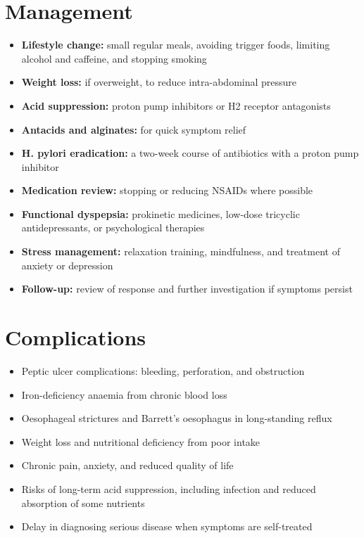 \section*{Management}
\begin{itemize}
    \item \textbf{Lifestyle change:} small regular meals, avoiding trigger foods, limiting alcohol and caffeine, and stopping smoking
    \item \textbf{Weight loss:} if overweight, to reduce intra-abdominal pressure
    \item \textbf{Acid suppression:} proton pump inhibitors or H2 receptor antagonists
    \item \textbf{Antacids and alginates:} for quick symptom relief
    \item \textbf{H. pylori eradication:} a two-week course of antibiotics with a proton pump inhibitor
    \item \textbf{Medication review:} stopping or reducing NSAIDs where possible
    \item \textbf{Functional dyspepsia:} prokinetic medicines, low-dose tricyclic antidepressants, or psychological therapies
    \item \textbf{Stress management:} relaxation training, mindfulness, and treatment of anxiety or depression
    \item \textbf{Follow-up:} review of response and further investigation if symptoms persist
\end{itemize}

\section*{Complications}
\begin{itemize}
    \item Peptic ulcer complications: bleeding, perforation, and obstruction
    \item Iron-deficiency anaemia from chronic blood loss
    \item Oesophageal strictures and Barrett's oesophagus in long-standing reflux
    \item Weight loss and nutritional deficiency from poor intake
    \item Chronic pain, anxiety, and reduced quality of life
    \item Risks of long-term acid suppression, including infection and reduced absorption of some nutrients
    \item Delay in diagnosing serious disease when symptoms are self-treated
\end{itemize}

